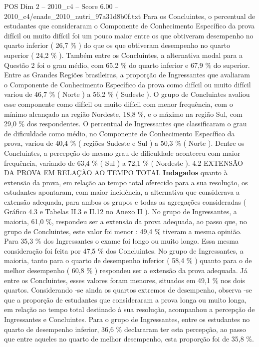 \begin{textsample}{POS Dim 2 – 2010\_c4 – Score 6.00 – 2010\_c4/enade\_2010\_nutri\_97a31d8b0f.txt}
Para os Concluintes, o percentual de estudantes que consideraram o Componente de Conhecimento Específico da prova difícil ou muito difícil foi um pouco maior entre os que obtiveram desempenho no quarto inferior ( 26,7 \% ) do que os que obtiveram desempenho no quarto superior ( 24,2 \% ).
Também entre os Concluintes, a alternativa modal para a Questão 2 foi o grau médio, com 65,2 \% do quarto inferior e 67,9 \% do superior.
Entre as Grandes Regiões brasileiras, a proporção de Ingressantes que avaliaram o Componente de Conhecimento Específico da prova como difícil ou muito difícil variou de 46,7 \% ( Norte ) a 56,2 \% ( Sudeste ).
O grupo de Concluintes avaliou esse componente como difícil ou muito difícil com menor frequência, com o mínimo alcançado na região Nordeste, 18,8 \%, e o máximo na região Sul, com 29,0 \% dos respondentes.
O percentual de Ingressantes que classificaram o grau de dificuldade como médio, no Componente de Conhecimento Específico da prova, variou de 40,4 \% ( regiões Sudeste e Sul ) a 50,3 \% ( Norte ).
Dentre os Concluintes, a percepção do mesmo grau de dificuldade aconteceu com maior frequência, variando de 63,4 \% ( Sul ) a 72,1 \% ( Nordeste ). 4.2 EXTENSÃO DA PROVA EM RELAÇÃO AO TEMPO TOTAL \textbf{Indagados} quanto à extensão da prova, em relação ao tempo total oferecido para a sua resolução, os estudantes apontaram, com maior incidência, a alternativa que considerava a extensão adequada, para ambos os grupos e todas as agregações consideradas ( Gráfico 4.3 e Tabelas II.3 e II.12 no Anexo II ).
No grupo de Ingressantes, a maioria, 61,0 \%, respondeu ser a extensão da prova adequada, ao passo que, no grupo de Concluintes, este valor foi menor : 49,4 \% tiveram a mesma opinião.
Para 35,3 \% dos Ingressantes o exame foi longo ou muito longo.
Essa mesma consideração foi feita por 47,5 \% dos Concluintes.
No grupo de Ingressantes, a maioria, tanto para o quarto de desempenho inferior ( 58,4 \% ) quanto para o de melhor desempenho ( 60,8 \% ) respondeu ser a extensão da prova adequada.
Já entre os Concluintes, esses valores foram menores, situados em 49,1 \% nos dois quartos.
Considerando -se ainda os quartos extremos de desempenho, observa -se que a proporção de estudantes que consideraram a prova longa ou muito longa, em relação ao tempo total destinado à sua resolução, acompanhou a percepção de Ingressantes e Concluintes.
Para o grupo de Ingressantes, entre os estudantes no quarto de desempenho inferior, 36,6 \% declararam ter esta percepção, ao passo que entre aqueles no quarto de melhor desempenho, esta proporção foi de 35,8 \%.

\end{textsample}
